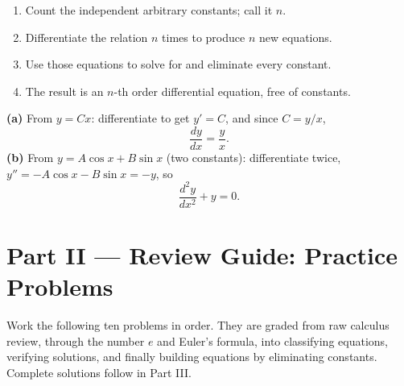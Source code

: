 \begin{methodbox}
\begin{enumerate}[leftmargin=1.6em, itemsep=2pt]
    \item Count the independent arbitrary constants; call it $n$.
    \item Differentiate the relation $n$ times to produce $n$ new equations.
    \item Use those equations to solve for and eliminate every constant.
    \item The result is an $n$-th order differential equation, free of constants.
\end{enumerate}
\end{methodbox}

\begin{examplebox}
\textbf{(a)} From $y = Cx$: differentiate to get $y' = C$, and since $C = y/x$,
\[ \frac{dy}{dx} = \frac{y}{x}. \]
\textbf{(b)} From $y = A\cos x + B\sin x$ (two constants): differentiate twice,
$y'' = -A\cos x - B\sin x = -y$, so
\[ \frac{d^{2}y}{dx^{2}} + y = 0. \]
\end{examplebox}

\clearpage
{}
{}
\section*{Part II --- Review Guide: Practice Problems}

Work the following ten problems in order. They are graded from raw calculus
review, through the number $e$ and Euler's formula, into classifying equations,
verifying solutions, and finally building equations by eliminating constants.
Complete solutions follow in Part III.

